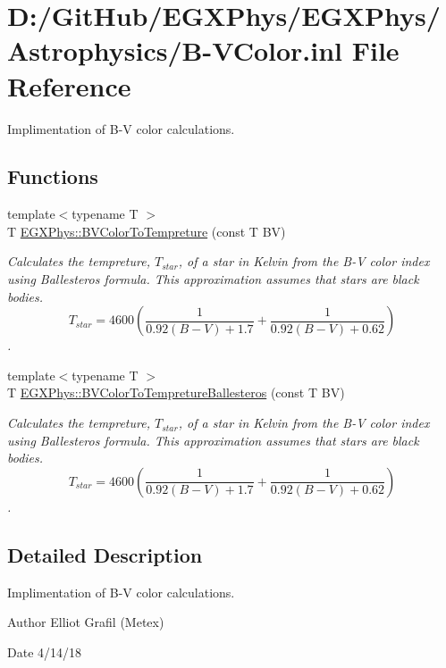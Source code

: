 \hypertarget{_b-_v_color_8inl}{}\section{D\+:/\+Git\+Hub/\+E\+G\+X\+Phys/\+E\+G\+X\+Phys/\+Astrophysics/\+B-\/\+V\+Color.inl File Reference}
\label{_b-_v_color_8inl}


Implimentation of B-\/V color calculations.  


\subsection*{Functions}
\begin{DoxyCompactItemize}
\item 
{\footnotesize template$<$typename T $>$ }\\T \mbox{\hyperlink{group___e_g_x_phys-_astrophysic-_b-_v_color_gad251a8c25285f5817e307c35c3ec971a}{E\+G\+X\+Phys\+::\+B\+V\+Color\+To\+Tempreture}} (const T BV)
\begin{DoxyCompactList}\small\item\em Calculates the tempreture, $T_{star}$, of a star in Kelvin from the B-\/V color index using Ballesteros\textquotesingle{} formula. This approximation assumes that stars are black bodies. \[T_{star}=4600 \left ( \frac{1}{0.92 (B-V)+ 1.7} + \frac{1}{0.92 (B-V) + 0.62} \right )\]. \end{DoxyCompactList}\item 
{\footnotesize template$<$typename T $>$ }\\T \mbox{\hyperlink{group___e_g_x_phys-_astrophysic-_b-_v_color_ga0e553143a3bb121c3ae50ca96c502140}{E\+G\+X\+Phys\+::\+B\+V\+Color\+To\+Tempreture\+Ballesteros}} (const T BV)
\begin{DoxyCompactList}\small\item\em Calculates the tempreture, $T_{star}$, of a star in Kelvin from the B-\/V color index using Ballesteros\textquotesingle{} formula. This approximation assumes that stars are black bodies. \[T_{star}=4600 \left ( \frac{1}{0.92 (B-V)+ 1.7} + \frac{1}{0.92 (B-V) + 0.62} \right )\]. \end{DoxyCompactList}\end{DoxyCompactItemize}


\subsection{Detailed Description}
Implimentation of B-\/V color calculations. 

\begin{DoxyAuthor}{Author}
Elliot Grafil (Metex) 
\end{DoxyAuthor}
\begin{DoxyDate}{Date}
4/14/18 
\end{DoxyDate}
